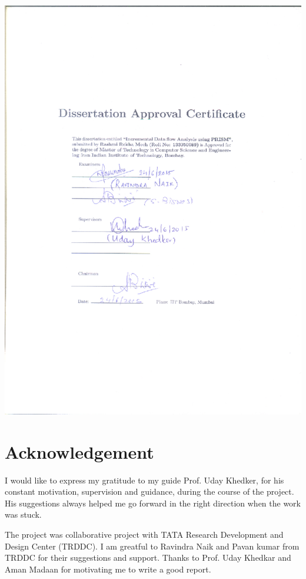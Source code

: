 \documentclass[11pt,a4paper,openright]{report}
\begin{document}
\includegraphics[width=1.3\textwidth, height=1.3\textheight]{approval.eps}



\chapter*{Acknowledgement}
I would like to express my gratitude to my guide Prof. Uday Khedker, for
his constant motivation, supervision and guidance, during the course of the
project. His suggestions always helped me go forward in the right direction
when the work was stuck.

The project was collaborative project with TATA Research Development and Design Center (TRDDC). I
am greatful to Ravindra Naik and Pavan kumar from TRDDC for their suggestions and support.
Thanks to Prof. Uday Khedkar and Aman Madaan 
for motivating me to write a good report.
\end{document}
